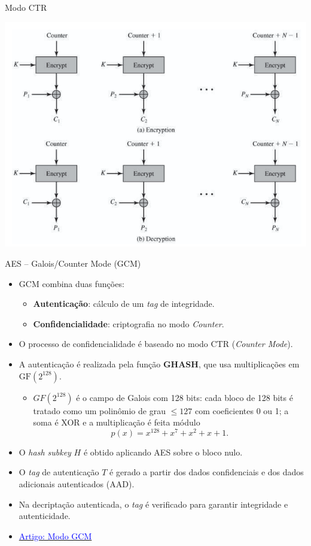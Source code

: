 \begin{frame}{Modo CTR}


    \centering
    \includegraphics[width=0.6\linewidth]{Figuras/aes-modo-ctr.png}

\end{frame}

\begin{frame}{AES -- Galois/Counter Mode (GCM)}
    \begin{itemize}
        \item GCM combina duas funções:
              \begin{itemize}
                  \item \textbf{Autenticação}: cálculo de um \textit{tag} de integridade.
                  \item \textbf{Confidencialidade}: criptografia no modo \textit{Counter}.
              \end{itemize}
        \item O processo de confidencialidade é baseado no modo CTR (\textit{Counter Mode}).
        \item A autenticação é realizada pela função \textbf{GHASH}, que usa multiplicações em $\text{GF}(2^{128})$.
              \begin{itemize}
                  \item \(GF(2^{128})\) é o campo de Galois com 128 bits: cada bloco de 128 bits é tratado como um polinômio de grau \(\leq 127\) com coeficientes 0 ou 1; a soma é XOR e a multiplicação é feita módulo
                        \[
                            p(x) = x^{128}+x^7+x^2+x+1.
                        \]
              \end{itemize}
        \item O \textit{hash subkey} $H$ é obtido aplicando AES sobre o bloco nulo.
        \item O \textit{tag} de autenticação $T$ é gerado a partir dos dados confidenciais e dos dados adicionais autenticados (AAD).
        \item Na decriptação autenticada, o \textit{tag} é verificado para garantir integridade e autenticidade.
        \item \href{https://ieeexplore.ieee.org/abstract/document/5953585?casa_token=4XfQGwEHfSEAAAAA:RZKOvTWEOaYpC0nIW8kEB8omke-XhdiG9iwkC4OEsp1yMXiZ6lIv6ckx9g_CffSJiCGgF9QCEg}{\textcolor{blue}{Artigo: Modo GCM}}
    \end{itemize}
\end{frame}

